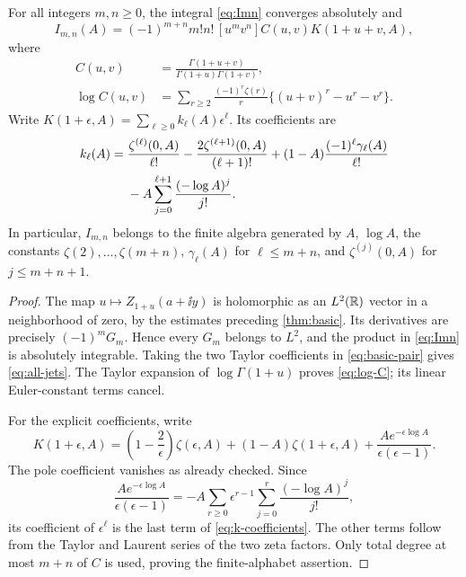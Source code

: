 \begin{theorem}\label{thm:all-stieltjes}
For all integers $m,n\ge0$, the integral \eqref{eq:Imn} converges absolutely
and
\begin{equation}\label{eq:all-jets}
 \boxed{\displaystyle
 I_{m,n}(A)=(-1)^{m+n}m!n!\,[u^mv^n]
      C(u,v)K(1+u+v,A),}
\end{equation}
where
\begin{align}
 C(u,v)&=\frac{\Gamma(1+u+v)}{\Gamma(1+u)\Gamma(1+v)},\label{eq:C}\\
 \log C(u,v)&=\sum_{r\ge2}\frac{(-1)^r\zeta(r)}r
          \{(u+v)^r-u^r-v^r\}.\label{eq:log-C}
\end{align}
Write $K(1+\epsilon,A)=\sum_{\ell\ge0}k_\ell(A)\epsilon^\ell$.
Its coefficients are
\begin{align}
 k_\ell(A)={}&\frac{\zeta^{(\ell)}(0,A)}{\ell!}
  -\frac{2\zeta^{(\ell+1)}(0,A)}{(\ell+1)!}
  +(1-A)\frac{(-1)^\ell\gamma_\ell(A)}{\ell!}\notag\\
 &-A\sum_{j=0}^{\ell+1}\frac{(-\log A)^j}{j!}.
       \label{eq:k-coefficients}
\end{align}
In particular, $I_{m,n}$ belongs to the finite algebra generated by
$A$, $\log A$, the constants $\zeta(2),\ldots,\zeta(m+n)$,
$\gamma_\ell(A)$ for $\ell\le m+n$, and
$\zeta^{(j)}(0,A)$ for $j\le m+n+1$.
\end{theorem}
\begin{proof}
The map $u\mapsto Z_{1+u}(a+\ii y)$ is holomorphic as an $L^2(\mathbb R)$ vector
in a neighborhood of zero, by the estimates preceding \cref{thm:basic}.
Its derivatives are precisely $(-1)^mG_m$. Hence every $G_m$ belongs to
$L^2$, and the product in \eqref{eq:Imn} is absolutely integrable.
Taking the two Taylor coefficients in \eqref{eq:basic-pair} gives
\eqref{eq:all-jets}. The Taylor expansion of $\log\Gamma(1+u)$ proves
\eqref{eq:log-C}; its linear Euler-constant terms cancel.

For the explicit coefficients, write
\[
 K(1+\epsilon,A)=\left(1-\frac2\epsilon\right)\zeta(\epsilon,A)
 +(1-A)\zeta(1+\epsilon,A)
 +\frac{A e^{-\epsilon\log A}}{\epsilon(\epsilon-1)}.
\]
The pole coefficient vanishes as already checked. Since
\[
 \frac{Ae^{-\epsilon\log A}}{\epsilon(\epsilon-1)}
 =-A\sum_{r\ge0}\epsilon^{r-1}
          \sum_{j=0}^r\frac{(-\log A)^j}{j!},
\]
its coefficient of $\epsilon^\ell$ is the last term of
\eqref{eq:k-coefficients}. The other terms follow from the Taylor and
Laurent series of the two zeta factors. Only total degree at most $m+n$
of $C$ is used, proving the finite-alphabet assertion.
\end{proof}

